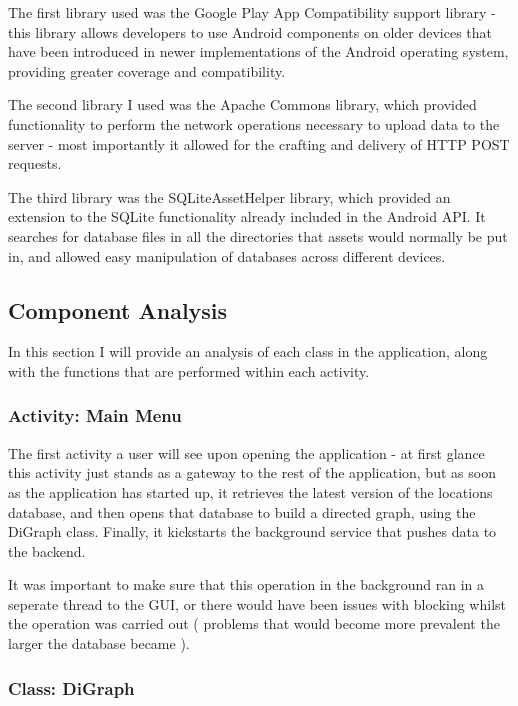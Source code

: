 \documentclass[11pt]{informatics-report}
\begin{document}
The first library used was the Google Play App Compatibility support library\cite{appcompat} - this library allows developers to use Android components on older devices that have been introduced in newer implementations of the Android operating system, providing greater coverage and compatibility. 

The second library I used was the Apache Commons library, which provided functionality to perform the network operations necessary to upload data to the server - most importantly it allowed for the crafting and delivery of HTTP POST requests.

The third library was the SQLiteAssetHelper library, which provided an extension to the SQLite functionality already included in the Android API. It searches for database files in all the directories that assets would normally be put in, and allowed easy manipulation of databases across different devices.

\subsection{Component Analysis}

In this section I will provide an analysis of each class in the application, along with the functions that are performed within each activity.

\subsubsection{Activity: Main Menu}

The first activity a user will see upon opening the application - at first glance this activity just stands as a gateway to the rest of the application, but as soon as the application has started up, it retrieves the latest version of the locations database, and then opens that database to build a directed graph, using the DiGraph class. Finally, it kickstarts the background service that pushes data to the backend.

It was important to make sure that this operation in the background ran in a seperate thread to the GUI, or there would have been issues with blocking whilst the operation was carried out ( problems that would become more prevalent the larger the database became ).

\subsubsection{Class: DiGraph} 
\end{document}
